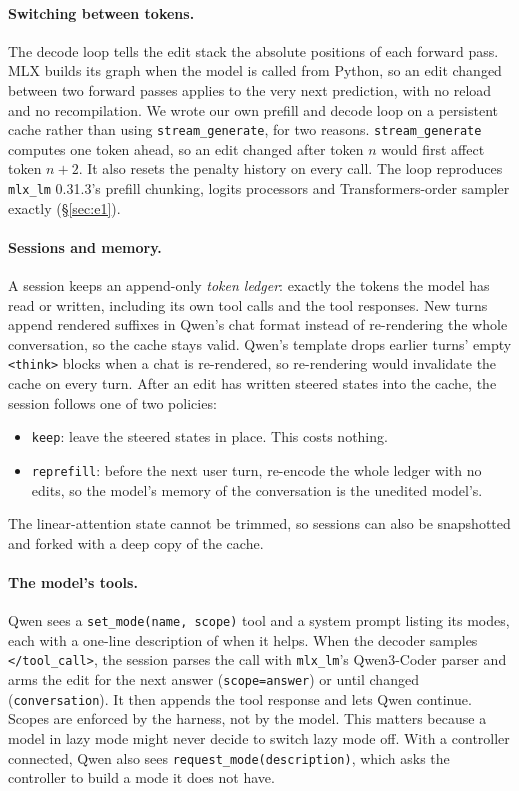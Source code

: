 \paragraph{Switching between tokens.} The decode loop tells the edit stack the absolute positions of each forward pass. MLX builds its graph when the model is called from Python, so an edit changed between two forward passes applies to the very next prediction, with no reload and no recompilation. We wrote our own prefill and decode loop on a persistent cache rather than using \texttt{stream\_generate}, for two reasons. \texttt{stream\_generate} computes one token ahead, so an edit changed after token $n$ would first affect token $n{+}2$. It also resets the penalty history on every call. The loop reproduces \texttt{mlx\_lm} 0.31.3's prefill chunking, logits processors and Transformers-order sampler exactly (\S\ref{sec:e1}).

\paragraph{Sessions and memory.} A session keeps an append-only \emph{token ledger}: exactly the tokens the model has read or written, including its own tool calls and the tool responses. New turns append rendered suffixes in Qwen's chat format instead of re-rendering the whole conversation, so the cache stays valid. Qwen's template drops earlier turns' empty \texttt{<think>} blocks when a chat is re-rendered, so re-rendering would invalidate the cache on every turn. After an edit has written steered states into the cache, the session follows one of two policies:
\begin{itemize}
\item \texttt{keep}: leave the steered states in place. This costs nothing.
\item \texttt{reprefill}: before the next user turn, re-encode the whole ledger with no edits, so the model's memory of the conversation is the unedited model's.
\end{itemize}
The linear-attention state cannot be trimmed, so sessions can also be snapshotted and forked with a deep copy of the cache.

\paragraph{The model's tools.} Qwen sees a \texttt{set\_mode(name, scope)} tool and a system prompt listing its modes, each with a one-line description of when it helps. When the decoder samples \texttt{</tool\_call>}, the session parses the call with \texttt{mlx\_lm}'s Qwen3-Coder parser and arms the edit for the next answer (\texttt{scope=answer}) or until changed (\texttt{conversation}). It then appends the tool response and lets Qwen continue. Scopes are enforced by the harness, not by the model. This matters because a model in lazy mode might never decide to switch lazy mode off. With a controller connected, Qwen also sees \texttt{request\_mode(description)}, which asks the controller to build a mode it does not have.

